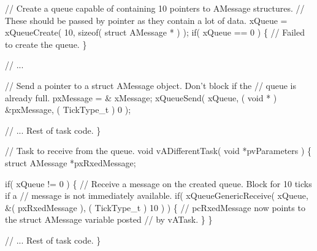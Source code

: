 \begin{DoxyPre}   // Create a queue capable of containing 10 pointers to AMessage structures.
   // These should be passed by pointer as they contain a lot of data.
   xQueue = xQueueCreate( 10, sizeof( struct AMessage * ) );
   if( xQueue == 0 )
   \{
    // Failed to create the queue.
   \}\end{DoxyPre}



\begin{DoxyPre}   // ...\end{DoxyPre}



\begin{DoxyPre}   // Send a pointer to a struct AMessage object.  Don't block if the
   // queue is already full.
   pxMessage = \& xMessage;
   xQueueSend( xQueue, ( void * ) \&pxMessage, ( TickType\_t ) 0 );\end{DoxyPre}



\begin{DoxyPre}   // ... Rest of task code.
\}\end{DoxyPre}



\begin{DoxyPre}// Task to receive from the queue.
void vADifferentTask( void *pvParameters )
\{
struct AMessage *pxRxedMessage;\end{DoxyPre}



\begin{DoxyPre}   if( xQueue != 0 )
   \{
    // Receive a message on the created queue.  Block for 10 ticks if a
    // message is not immediately available.
    if( xQueueGenericReceive( xQueue, \&( pxRxedMessage ), ( TickType\_t ) 10 ) )
    \{
        // pcRxedMessage now points to the struct AMessage variable posted
        // by vATask.
    \}
   \}\end{DoxyPre}



\begin{DoxyPre}   // ... Rest of task code.
\}
\end{DoxyPre}
 